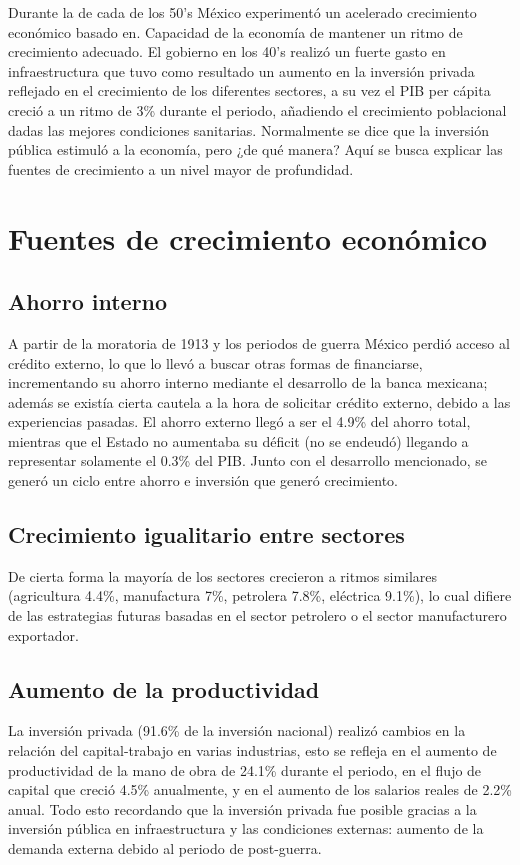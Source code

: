 
Durante la de cada de los 50's México experimentó un acelerado crecimiento económico basado en.
Capacidad de la economía de mantener un ritmo de crecimiento adecuado.
El gobierno en los 40's realizó un fuerte gasto en infraestructura que tuvo como resultado un aumento en la inversión privada reflejado en el crecimiento de los diferentes sectores, a su vez el PIB per cápita creció a un ritmo de 3\% durante el periodo, añadiendo el crecimiento poblacional dadas las mejores condiciones sanitarias.
Normalmente se dice que la inversión pública estimuló a la economía, pero ¿de qué manera? Aquí se busca explicar las fuentes de crecimiento a un nivel mayor de profundidad.

\section{Fuentes de crecimiento económico}
\subsection{Ahorro interno}
A partir de la moratoria de 1913 y los periodos de guerra México perdió acceso al crédito externo, lo que lo llevó a buscar otras formas de financiarse, incrementando su ahorro interno mediante el desarrollo de la banca mexicana; además se existía cierta cautela a la hora de solicitar crédito externo, debido a las experiencias pasadas.
El ahorro externo llegó a ser el 4.9\% del ahorro total, mientras que el Estado no aumentaba su déficit (no se endeudó) llegando a representar solamente el 0.3\% del PIB. Junto con el desarrollo mencionado, se generó un ciclo entre ahorro e inversión que generó crecimiento.

\subsection{Crecimiento igualitario entre sectores}
De cierta forma la mayoría de los sectores crecieron a ritmos similares (agricultura 4.4\%, manufactura 7\%, petrolera 7.8\%, eléctrica 9.1\%), lo cual difiere de las estrategias futuras basadas en el sector petrolero o el sector manufacturero exportador.

\subsection{Aumento de la productividad}
La inversión privada (91.6\% de la inversión nacional) realizó cambios en la relación del capital-trabajo en varias industrias, esto se refleja en el aumento de productividad de la mano de obra de 24.1\% durante el periodo, en el flujo de capital que creció 4.5\% anualmente, y en el aumento de los salarios reales de 2.2\% anual. Todo esto recordando que la inversión privada fue posible gracias a la inversión pública en infraestructura y las condiciones externas: aumento de la demanda externa debido al periodo de post-guerra.

